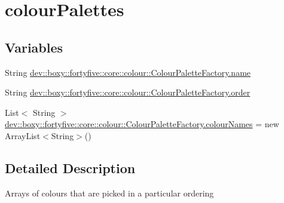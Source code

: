 \hypertarget{group__colour_palettes}{
\section{colourPalettes}
\label{db/d3d/group__colour_palettes}
}
\subsection*{Variables}
\begin{DoxyCompactItemize}
\item 
String \hyperlink{group__colour_palettes_gaefe7048b51865679210bed6bac8ec293}{dev::boxy::fortyfive::core::colour::ColourPaletteFactory.name}
\item 
String \hyperlink{group__colour_palettes_gaf45caec18a77e26b4836d04f51f7c267}{dev::boxy::fortyfive::core::colour::ColourPaletteFactory.order}
\item 
List$<$ String $>$ \hyperlink{group__colour_palettes_gaf1d7c0a9d0cb9700e6eaaad2664109a7}{dev::boxy::fortyfive::core::colour::ColourPaletteFactory.colourNames} = new ArrayList$<$String$>$()
\end{DoxyCompactItemize}


\subsection{Detailed Description}
Arrays of colours that are picked in a particular ordering 

